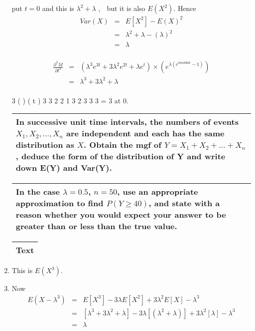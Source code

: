 \documentclass[a4paper,12pt]{article}
\begin{document}
\begin{enumerate}
 put $t=0$ and this is $\lambda^2 + \lambda$ ,

but it is also $E(X^2)$. Hence 
\begin{eqnarray*}
Var(X) &=& E[X^2] - E (X)^2 \\
&=&  \lambda^2 +\lambda - (\lambda)^2 \\
&=& \lambda\\
\end{eqnarray*}

\begin{eqnarray*} \frac{\partial^3M}{\partial t^3} &=& \left( \lambda^3 e^{3t} + 3 \lambda^2 e^{2t} + \lambda e^{t} \right) \times \left(e^{\lambda(e^{lambda t} - 1) } \right)\\
&=&  \lambda^3 + 3\lambda^2 + \lambda \\
\end{eqnarray*}

3 ( ) ( t )
3 3 2 2 1 3 2 3
3 3 = 3 at 0.


\begin{table}[ht!]
 \centering
 \begin{tabular}{|p{15cm}|}
 \hline
\noindent 
In successive unit time intervals, the numbers of events $X_1, X_2, \ldots, X_n$ are
independent and each has the same distribution as $X$. Obtain the mgf of
$Y = X_1 + X_2 + \ldots + X_n$ , deduce the form of the distribution of Y and write down
E(Y) and Var(Y).
\\ \hline
  \end{tabular}
\end{table}

\begin{table}[ht!]
 \centering
 \begin{tabular}{|p{15cm}|}
 \hline
\noindent 
In the case $\lambda = 0.5$, $n = 50$, use an appropriate approximation to find $P(Y \geq 40)$, and
state with a reason whether you would expect your answer to be greater than or
less than the true value.
\\ \hline
  \end{tabular}
\end{table}
\begin{table}[ht!]
 \centering
 \begin{tabular}{|p{15cm}|}
 \hline
\noindent Text
\\ \hline
  \end{tabular}
\end{table}
\item This is $E(X^3)$.

\item Now
\begin{eqnarray*}  
E (X -\lambda^3 ) &=&  
E [X^3] - 3\lambda E[X^2] + 3\lambda^2E[X]-\lambda^3 \\
&=&  \left[\lambda^3 + 3\lambda^2 +\lambda \right]- 3\lambda \left[ (\lambda^2 +\lambda ) \right]+ 3\lambda^2 \left[\lambda \right] -\lambda^3 \\ 
&=&  \lambda 
\end{eqnarray*}


\end{enumerate}
\end{document}

